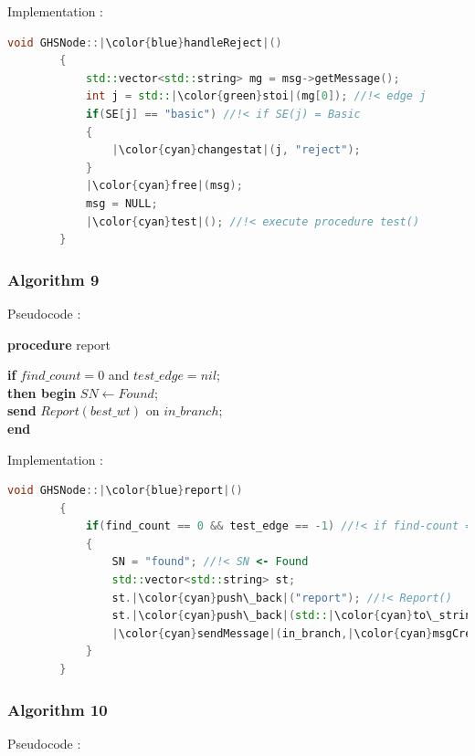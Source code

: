 \documentclass[letterpaper,11pt]{article}
\begin{document}
	\bigskip 
	
	Implementation : 
	
	
	\begin{lstlisting}[language=C++, caption= handleReject()]
		void GHSNode::|\color{blue}handleReject|()
		{
			std::vector<std::string> mg = msg->getMessage(); 
			int j = std::|\color{green}stoi|(mg[0]); //!< edge j
			if(SE[j] == "basic") //!< if SE(j) = Basic 
			{
				|\color{cyan}changestat|(j, "reject");
			}
			|\color{cyan}free|(msg);
			msg = NULL;
			|\color{cyan}test|(); //!< execute procedure test()
		}
	\end{lstlisting}
	
	
	
	\subsubsection{Algorithm 9}
	Pseudocode : \\
	
	\begin{tcolorbox}
		{\bf procedure} report
		\begin{algorithmic}
			\STATE \textbf{if} $find\_count = 0$ and $test\_edge = nil$; \\
			{\quad \quad \bf then begin} $SN \leftarrow Found$; \\
			{\quad \quad \quad \quad \bf send} $Report(best\_wt)$ on $in\_branch$; \\
			{\qquad \qquad \bf end}
		\end{algorithmic}
	\end{tcolorbox}
	
	\bigskip 
	
	Implementation : 
	
	
	\begin{lstlisting}[language=C++, caption= report()]
		void GHSNode::|\color{blue}report|()
		{
			if(find_count == 0 && test_edge == -1) //!< if find-count = 0 and test-edge = nil
			{
				SN = "found"; //!< SN <- Found
				std::vector<std::string> st; 
				st.|\color{cyan}push\_back|("report"); //!< Report()
				st.|\color{cyan}push\_back|(std::|\color{cyan}to\_string|(best_weight)); //!< best-wt
				|\color{cyan}sendMessage|(in_branch,|\color{cyan}msgCreater|(st)); //!< send Report(best-wt) on in-branch
			}
		}
	\end{lstlisting}

	
	\subsubsection{Algorithm 10}
	Pseudocode : \\
	
\end{document}
